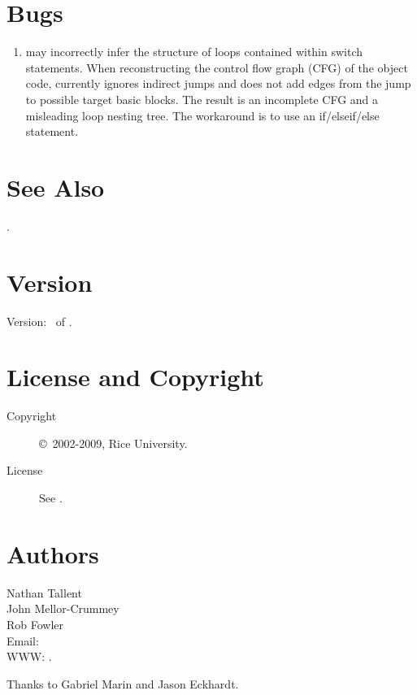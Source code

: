 \documentclass[english]{article}
\begin{document}
\section{Bugs}

\begin{enumerate}

\item {} may incorrectly infer the structure of loops contained within switch statements.
When reconstructing the control flow graph (CFG) of the object code,  currently ignores indirect jumps and does not add edges from the jump to possible target basic blocks.
The result is an incomplete CFG and a misleading loop nesting tree.
The workaround is to use an if/elseif/else statement.

\end{enumerate}

\section{See Also}

.

\section{Version}

Version: \Version\ of \Date.

\section{License and Copyright}

\begin{description}
\item[Copyright] \copyright\ 2002-2009, Rice University.
\item[License] See .
\end{description}

\section{Authors}

\noindent
Nathan Tallent \\
John Mellor-Crummey \\
Rob Fowler \\
Email:  \\
WWW: .

Thanks to Gabriel Marin and Jason Eckhardt.

\LatexManEnd
\end{document}

